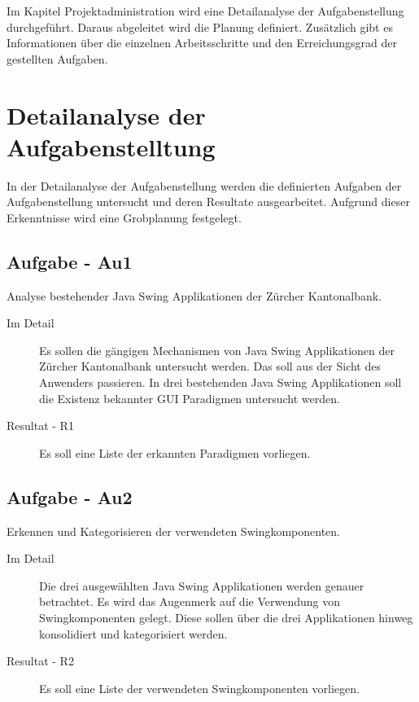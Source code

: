   Im Kapitel Projektadministration wird eine Detailanalyse der Aufgabenstellung
  durchgeführt. Daraus abgeleitet wird die Planung definiert. Zusätzlich gibt es
  Informationen über die einzelnen Arbeitsschritte und den Erreichungsgrad der
  gestellten Aufgaben.
  
  \section{Detailanalyse der Aufgabenstelltung}

  In der Detailanalyse der Aufgabenstellung werden die definierten Aufgaben der
  Aufgabenstellung untersucht und deren Resultate ausgearbeitet. Aufgrund dieser
  Erkenntnisse wird eine Grobplanung festgelegt.
  
  \subsection{Aufgabe - Au1\label{itm:Aufgabe-01}}

  \begin{itshape}Analyse bestehender Java Swing Applikationen der Zürcher
  Kantonalbank.\end{itshape}
  
  \begin{description}
    \item[Im Detail\label{itm:Detail-01}]
    Es sollen die gängigen Mechanismen von Java Swing Applikationen der Zürcher
    Kantonalbank untersucht werden. Das soll aus der Sicht des Anwenders
    passieren. In drei bestehenden Java Swing Applikationen soll die Existenz
    bekannter GUI Paradigmen untersucht werden.
    \item[Resultat - R1\label{itm:Resultat-01}]
    Es soll eine Liste der erkannten Paradigmen vorliegen.
  \end{description}
  
  \subsection{Aufgabe - Au2\label{itm:Aufgabe-02}}

  \begin{itshape}Erkennen und Kategorisieren der verwendeten
  Swingkomponenten.\end{itshape}

  \begin{description}
    \item[Im Detail\label{itm:Detail-02}]
    Die drei ausgewählten Java Swing Applikationen werden genauer betrachtet.
    Es wird das Augenmerk auf die Verwendung von Swingkomponenten gelegt. Diese
    sollen über die drei Applikationen hinweg konsolidiert und kategorisiert
    werden.
    \item[Resultat - R2\label{itm:Resultat-02}]
    Es soll eine Liste der verwendeten Swingkomponenten vorliegen.
  \end{description}
  
